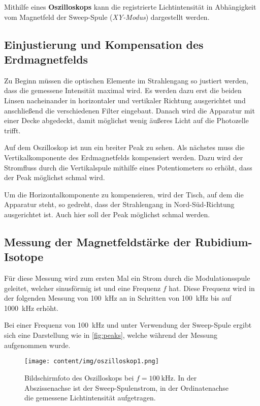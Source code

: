     Mithilfe eines \textbf{Oszilloskops} kann die registrierte Lichtintensität
    in Abhängigkeit vom Magnetfeld der Sweep-Spule (\textit{XY-Modus})
    dargestellt werden.

\subsection{Einjustierung und Kompensation des Erdmagnetfelds}
\label{sec:durchfuehrung:einjustierung}

    Zu Beginn müssen die optischen Elemente im Strahlengang so justiert werden,
    dass die gemessene Intensität maximal wird.
    Es werden dazu erst die beiden Linsen nacheinander in horizontaler und vertikaler Richtung ausgerichtet
    und anschließend die verschiedenen Filter eingebaut.
    Danach wird die Apparatur mit einer Decke abgedeckt,
    damit möglichst wenig äußeres Licht auf die Photozelle trifft.

    Auf dem Oszilloskop ist nun ein breiter Peak zu sehen.
    Als nächstes muss die Vertikalkomponente des Erdmagnetfelds kompensiert werden.
    Dazu wird der Stromfluss durch die Vertikalspule mithilfe eines Potentiometers so erhöht,
    dass der Peak möglichst schmal wird.

    Um die Horizontalkomponente zu kompensieren,
    wird der Tisch, auf dem die Apparatur steht, so gedreht,
    dass der Strahlengang in Nord-Süd-Richtung ausgerichtet ist.
    Auch hier soll der Peak möglichst schmal werden.

\subsection{Messung der Magnetfeldstärke der Rubidium-Isotope} %
\label{sec:durchfuehrung:messung}

    Für diese Messung wird zum ersten Mal ein Strom durch die Modulationsspule geleitet,
    welcher sinusförmig ist und eine Frequenz $f$ hat.
    Diese Frequenz wird in der folgenden Messung von \SI{100}{\kilo\hertz} an in Schritten von \SI{100}{\kilo\hertz} bis auf \SI{1000}{\kilo\hertz} erhöht.

    Bei einer Frequenz von \SI{100}{\kilo\hertz} und unter Verwendung der Sweep-Spule ergibt sich eine Darstellung wie in \autoref{fig:peaks},
    welche während der Messung aufgenommen wurde.
    \begin{figure}[H]
       \centering
       \texttt{[image: content/img/oszilloskop1.png]}
       \caption{
            Bildschirmfoto des Oszilloskops bei $f = \SI{100}{\kilo\hertz}$.
            In der Abszissenachse ist der Sweep-Spulenstrom, in der Ordinatenachse die gemessene Lichtintensität aufgetragen.
        }
       \label{fig:peaks}
    \end{figure}

